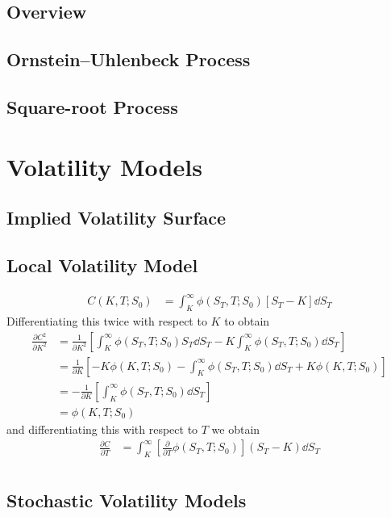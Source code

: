 \subsection{Overview}
\subsection{Ornstein--Uhlenbeck Process}
\subsection{Square-root Process}
\section{Volatility Models}
\subsection{Implied Volatility Surface}
\subsection{Local Volatility Model}
\begin{align}
	C(K, T; S_0) &= \int_K^\infty \phi(S_T, T; S_0) [S_T - K] \dd S_T
\end{align}
Differentiating this twice with respect to $K$ to obtain
\begin{align}
	\frac{\partial C^2}{\partial K^2} &= \frac{1}{\partial K^2} \left[\int_K^\infty \phi(S_T, T; S_0) S_T \dd S_T  - K \int_K^\infty \phi(S_T, T; S_0) \dd S_T \right] \nonumber \\
	&= \frac{1}{\partial K} \left[- K \phi(K, T; S_0) - \int_K^\infty \phi(S_T, T; S_0) \dd S_T + K \phi(K, T; S_0) \right] \nonumber \\
	&= - \frac{1}{\partial K} \left[ \int_K^\infty \phi(S_T, T; S_0) \dd S_T \right] \nonumber \\
    &= \phi(K, T; S_0)
\end{align}
and differentiating this with respect to $T$ we obtain
\begin{align}
  \frac{\partial C}{\partial T} & = \int_{K}^{\infty} \left[\frac{\partial}{\partial T} \phi(S_T, T;S_0) \right] (S_T - K) \dd S_T \nonumber \\
\end{align}


\subsection{Stochastic Volatility Models}
